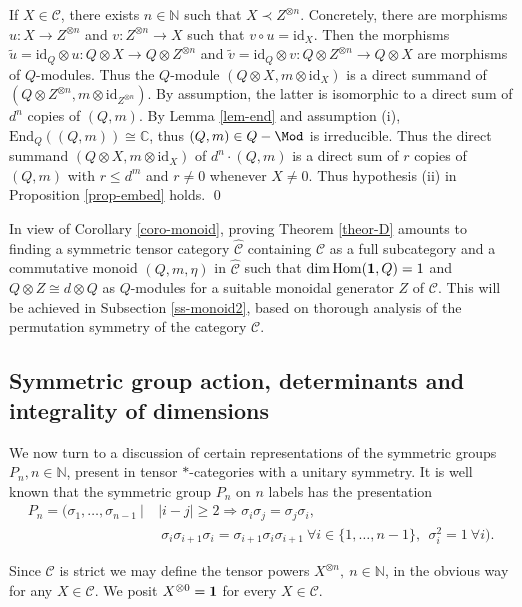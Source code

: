 \documentclass[12pt]{article}
\theoremstyle{definition}
\theoremstyle{definition}
\theoremstyle{remark}
\newcommand{\impl}{\Rightarrow}
\def\2#1{{\mathcal #1}}
\def\7#1{{\mathbb #1}}
\def\1#1{{\bf #1}}
\newcommand{\Hom}{\mathrm{Hom}}
\newcommand{\End}{\mathrm{End}}
\newcommand{\rarr}{\rightarrow}
\def\id{\mathrm{id}}
\begin{document}
\prf If $X\in\2C$, there exists $n\in\7N$ such that $X\prec Z^{\otimes n}$. Concretely, there are
morphisms $u:X\rarr Z^{\otimes n}$ and $v:Z^{\otimes n}\rarr X$ such that $v\circ u=\id_X$.
Then the morphisms $\tilde{u}=\id_Q\otimes u: Q\otimes X\rarr Q\otimes Z^{\otimes n}$ and
$\tilde{v}=\id_Q\otimes v:Q\otimes Z^{\otimes n}\rarr Q\otimes X$ are morphisms of $Q$-modules.
Thus the $Q$-module $(Q\otimes X,m\otimes\id_X)$ is a direct summand of 
$(Q\otimes Z^{\otimes n},m\otimes\id_{Z^{\otimes n}})$. By assumption, the latter is isomorphic to a
direct sum of $d^n$ copies of $(Q,m)$. By Lemma \ref{lem-end} and assumption (i),
$\End_Q((Q,m))\cong\7C$, thus $(Q,m)\in Q-\Mod$ is irreducible. Thus the direct summand 
$(Q\otimes X,m\otimes\id_X)$ of $d^n\cdot(Q,m)$ is a direct sum of $r$ copies of $(Q,m)$ with 
$r\le d^m$ and $r\ne 0$ whenever $X\ne 0$. Thus hypothesis (ii) in Proposition \ref{prop-embed} holds.
\qed

In view of Corollary \ref{coro-monoid}, proving Theorem \ref{theor-D} amounts to finding a symmetric
tensor category $\widehat{\2C}$ containing $\2C$ as a full subcategory and a commutative monoid
$(Q,m,\eta)$ in $\widehat{\2C}$ such that $\dim\Hom(\11,Q)=1$ and $Q\otimes Z\cong d\otimes Q$ as
$Q$-modules for a suitable monoidal generator $Z$ of $\2C$. This will be achieved in Subsection
\ref{ss-monoid2}, based on thorough analysis of the permutation symmetry of the category $\2C$.




\subsection{Symmetric group action, determinants and
  integrality of dimensions} \label{saggy}
We now turn to a discussion of certain representations of the symmetric groups $P_n, n\in\7N$,
present in tensor $*$-categories with a unitary symmetry. It is well known that the symmetric group
$P_n$ on $n$ labels has the presentation 
\[ \begin{aligned} P_n=(\sigma_1,\ldots,\sigma_{n-1} \
  | & \ |i-j|\ge 2\impl\sigma_i\sigma_j =
  \sigma_j\sigma_i, \\ & \ \ 
   \sigma_i\sigma_{i+1}\sigma_i=\sigma_{i+1}\sigma_i\sigma_{i+ 1} \ \forall i\in\{1,\ldots,n-1\},
   \ \ \sigma_i^2=1 \ \forall i). \end{aligned} \]

   Since $\2C$ is strict we may define the tensor powers $X^{\otimes
     n},\ n\in\7N$, in the obvious way for any $X\in\2C$. We posit
   $X^{\otimes 0}=\11$ for every $X\in\2C$.
\end{document}
